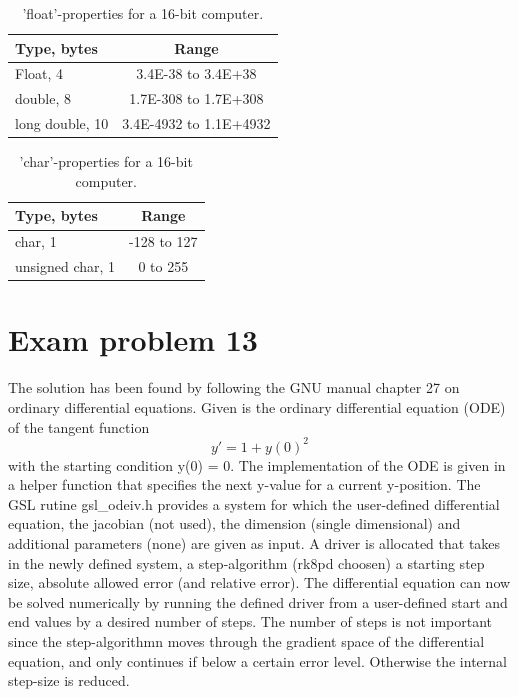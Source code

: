 \documentclass[twocolumn]{article}
\begin{document}
\begin{table}[h] \center
\begin{tabular}{l|c}
Type, bytes		&	Range 						\\\hline
Float, 4		&	3.4E-38 to 3.4E+38			\\
double, 8		&	1.7E-308 to 1.7E+308		\\
long double, 10	&	3.4E-4932 to 1.1E+4932
\end{tabular}
\caption{'float'-properties for a 16-bit computer.}
\label{table-float}
\end{table}

\begin{table}[h] \center
\begin{tabular}{l|c}
Type, bytes		&	Range 		\\\hline
char, 1			&	-128 to 127	\\
unsigned char, 1&	0 to 255	
\end{tabular}
\caption{'char'-properties for a 16-bit computer.}
\label{table-char}
\end{table}



\newpage
\section{Exam problem 13}
The solution has been found by following the GNU manual chapter 27 on ordinary differential equations. Given is the ordinary differential equation (ODE) of the tangent function
\begin{equation}
y' = 1 + y(0)^2
\label{eq-ode}
\end{equation}
with the starting condition y(0) = 0. The implementation of the ODE is given in a helper function that specifies the next y-value for a current y-position. The GSL rutine gsl\_odeiv.h provides a system for which the user-defined differential equation, the jacobian (not used), the dimension (single dimensional) and additional parameters (none) are given as input. A driver is allocated that takes in the newly defined system, a step-algorithm (rk8pd choosen) a starting step size, absolute allowed error (and relative error). The differential equation can now be solved numerically by running the defined driver from a user-defined start and end values by a desired number of steps. The number of steps is not important since the step-algorithmn moves through the gradient space of the differential equation, and only continues if below a certain error level. Otherwise the internal step-size is reduced.
\end{document}
